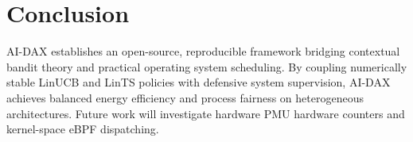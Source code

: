 \documentclass[conference]{IEEEtran}
\begin{document}
\section{Conclusion}
AI-DAX establishes an open-source, reproducible framework bridging contextual bandit theory and practical operating system scheduling. By coupling numerically stable LinUCB and LinTS policies with defensive system supervision, AI-DAX achieves balanced energy efficiency and process fairness on heterogeneous architectures. Future work will investigate hardware PMU hardware counters and kernel-space eBPF dispatching.



\end{document}
